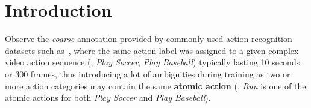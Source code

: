 \documentclass[10pt,twocolumn,letterpaper]{article}
\begin{document}
\vspace{-1.5em}
\section{Introduction}

Observe the {\em coarse} annotation provided by commonly-used action recognition datasets such as~\cite{kinetics400,HMDB51,ucf101}, 
where the same action label was assigned to a given complex video action sequence (\eg, \textit{Play Soccer}, \textit{Play Baseball}) typically lasting 10 seconds or 300 frames, thus introducing a lot of ambiguities during training as two or more action categories may contain the same \textbf{atomic action}
(\eg, \textit{Run} is one of the atomic actions for both \textit{Play Soccer} and \textit{Play Baseball}). 
\end{document}

